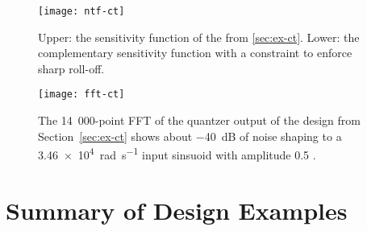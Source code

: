 \begin{figure}
	\centering
	\texttt{[image: ntf-ct]}
	\caption{Upper: the sensitivity function of the  from \autoref{sec:ex-ct}. Lower: the complementary sensitivity function with a  constraint to enforce sharp roll-off.} \label{fig:ntf-ct}
\end{figure}

\begin{figure}
	\centering
	\texttt{[image: fft-ct]}
	\caption{The 14~000-point FFT of the quantzer output of the  design from Section~\ref{sec:ex-ct} shows about \SI{-40}{\deci\bel} of noise shaping to a \SI{3.46e4}{\radian\per\second} input sinsuoid with amplitude 0.5 .} \label{fig:fft-ct}
\end{figure}

\section{Summary of Design Examples}
\label{sec:ex-compare}